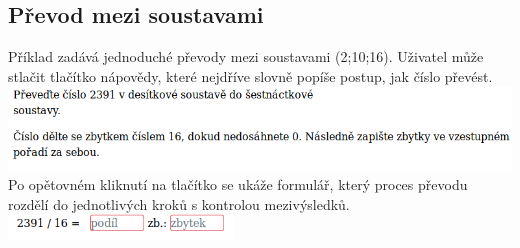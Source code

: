 \documentclass[
]{article}
\begin{document}
\subsection{Převod mezi soustavami}

Příklad zadává jednoduché převody mezi soustavami (2;10;16). Uživatel
může stlačit tlačítko nápovědy, které nejdříve slovně popíše postup, jak
číslo převést.\\
\includegraphics{../../doc-images/slovni.png}\\
Po opětovném
kliknutí na tlačítko se ukáže formulář, který proces převodu rozdělí do
jednotlivých kroků s kontrolou mezivýsledků.\\
\includegraphics[width=6cm]{../../doc-images/formularova.png}\\

\newpage

\end{document}
